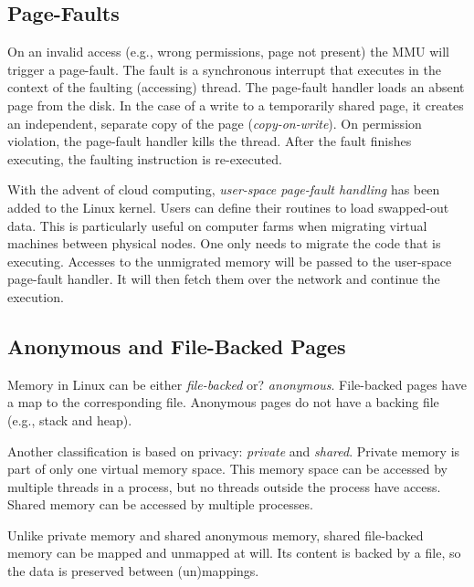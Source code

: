 \subsection{Page-Faults}
\label{subsec:pagefaults}


On an invalid access (e.g., wrong permissions, page not present) the MMU will
trigger a page-fault. The fault is a synchronous interrupt that executes in the
context of the faulting (accessing) thread. The page-fault handler loads an
absent page from the disk. In the case of a write to a temporarily shared page,
it creates an independent, separate copy of the page (\emph{copy-on-write}). On
permission violation, the page-fault handler kills the thread. After the fault
finishes executing, the faulting instruction is re-executed. 

With the advent of cloud computing, \emph{user-space page-fault handling} has
been added to the Linux kernel. Users can define their routines to load
swapped-out data. This is particularly useful on computer farms when migrating
virtual machines between physical nodes. One only needs to migrate the code that
is executing. Accesses to the unmigrated memory will be passed to the user-space
page-fault handler. It will then fetch them over the network and continue the
execution.

\subsection{Anonymous and File-Backed Pages}
\label{subsec:anofilepages}


Memory in Linux can be either \emph{file-backed} or? \emph{anonymous}.
File-backed pages have a map to the corresponding file. Anonymous pages do not
have a backing file (e.g., stack and heap).

Another classification is based on privacy: \emph{private} and \emph{shared}. 
Private memory is part of only one virtual memory space. This memory space can 
be accessed by multiple threads in a process, but no threads outside the process
have access. Shared memory can be accessed by multiple processes.

Unlike private memory and shared anonymous memory, shared file-backed memory can
be mapped and unmapped at will. Its content is backed by a file, so the data is 
preserved between (un)mappings.

